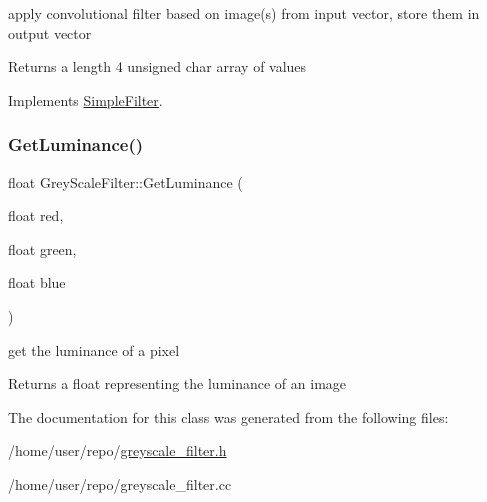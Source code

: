 apply convolutional filter based on image(s) from input vector, store them in output vector 

\begin{DoxyReturn}{Returns}
a length 4 unsigned char array of values 
\end{DoxyReturn}


Implements \hyperlink{classSimpleFilter_a24100e6c29c4bf3bddf2763c22622d75}{Simple\+Filter}.

\mbox{\label{classGreyScaleFilter_a89a03b17fa1ee8c556eeb173b11bf4e4}} 
\subsubsection{\texorpdfstring{Get\+Luminance()}{GetLuminance()}}
{\footnotesize\ttfamily float Grey\+Scale\+Filter\+::\+Get\+Luminance (\begin{DoxyParamCaption}\item[{float}]{red,  }\item[{float}]{green,  }\item[{float}]{blue }\end{DoxyParamCaption})}



get the luminance of a pixel 

\begin{DoxyReturn}{Returns}
a float representing the luminance of an image 
\end{DoxyReturn}


The documentation for this class was generated from the following files\+:\begin{DoxyCompactItemize}
\item 
/home/user/repo/\hyperlink{greyscale__filter_8h}{greyscale\+\_\+filter.\+h}\item 
/home/user/repo/greyscale\+\_\+filter.\+cc\end{DoxyCompactItemize}
